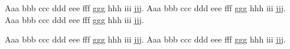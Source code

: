 \documentclass{article}
\begin{document}
Aaa bbb ccc ddd eee fff ggg hhh iii jjj. Aaa bbb ccc ddd eee fff ggg hhh iii
jjj. Aaa  bbb ccc ddd eee fff ggg hhh
iii jjj.

Aaa bbb ccc ddd eee fff ggg hhh iii jjj. Aaa bbb ccc ddd eee fff ggg hhh iii
jjj.
\end{document}
